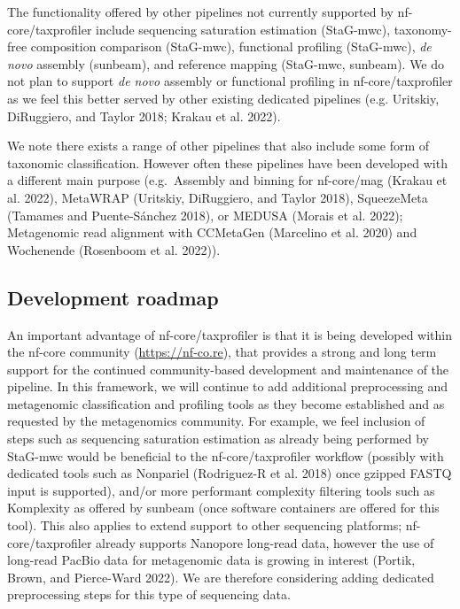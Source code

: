 \documentclass[
]{article}
\begin{document}
The functionality offered by other pipelines not currently supported by
nf-core/taxprofiler include sequencing saturation estimation (StaG-mwc),
taxonomy-free composition comparison (StaG-mwc), functional profiling
(StaG-mwc), \emph{de novo} assembly (sunbeam), and reference mapping
(StaG-mwc, sunbeam). We do not plan to support \emph{de novo} assembly
or functional profiling in nf-core/taxprofiler as we feel this better
served by other existing dedicated pipelines (e.g. Uritskiy, DiRuggiero,
and Taylor 2018; Krakau et al. 2022).

We note there exists a range of other pipelines that also include some
form of taxonomic classification. However often these pipelines have
been developed with a different main purpose (e.g.~Assembly and binning
for nf-core/mag (Krakau et al. 2022), MetaWRAP (Uritskiy, DiRuggiero,
and Taylor 2018), SqueezeMeta (Tamames and Puente-Sánchez 2018), or
MEDUSA (Morais et al. 2022); Metagenomic read alignment with CCMetaGen
(Marcelino et al. 2020) and Wochenende (Rosenboom et al. 2022)).

\hypertarget{development-roadmap}{%
\subsection{Development roadmap}\label{development-roadmap}}

An important advantage of nf-core/taxprofiler is that it is being
developed within the nf-core community (\url{https://nf-co.re}), that
provides a strong and long term support for the continued
community-based development and maintenance of the pipeline. In this
framework, we will continue to add additional preprocessing and
metagenomic classification and profiling tools as they become
established and as requested by the metagenomics community. For example,
we feel inclusion of steps such as sequencing saturation estimation as
already being performed by StaG-mwc would be beneficial to the
nf-core/taxprofiler workflow (possibly with dedicated tools such as
Nonpariel (Rodriguez-R et al. 2018) once gzipped FASTQ input is
supported), and/or more performant complexity filtering tools such as
Komplexity as offered by sunbeam (once software containers are offered
for this tool). This also applies to extend support to other sequencing
platforms; nf-core/taxprofiler already supports Nanopore long-read data,
however the use of long-read PacBio data for metagenomic data is growing
in interest (Portik, Brown, and Pierce-Ward 2022). We are therefore
considering adding dedicated preprocessing steps for this type of
sequencing data.
\end{document}
